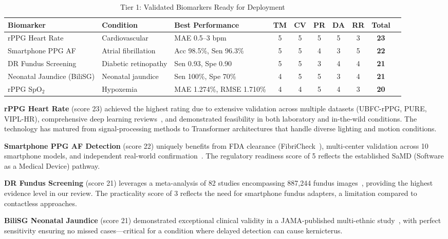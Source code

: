 \documentclass[conference]{IEEEtran}
\begin{document}
\begin{table}[t]
\caption{Tier 1: Validated Biomarkers Ready for Deployment}
\label{tab:tier1}
\centering
\small
\begin{tabular}{p{2.8cm}p{2.2cm}p{3.5cm}ccccccc}
\toprule
\textbf{Biomarker} & \textbf{Condition} & \textbf{Best Performance} & \textbf{TM} & \textbf{CV} & \textbf{PR} & \textbf{DA} & \textbf{RR} & \textbf{Total} \\
\midrule
rPPG Heart Rate & Cardiovascular & MAE 0.5--3 bpm & 5 & 5 & 5 & 5 & 3 & \textbf{23} \\
Smartphone PPG AF & Atrial fibrillation & Acc 98.5\%, Sen 96.3\% & 5 & 5 & 4 & 3 & 5 & \textbf{22} \\
DR Fundus Screening & Diabetic retinopathy & Sen 0.93, Spe 0.90 & 5 & 5 & 3 & 4 & 4 & \textbf{21} \\
Neonatal Jaundice (BiliSG) & Neonatal jaundice & Sen 100\%, Spe 70\% & 4 & 5 & 5 & 3 & 4 & \textbf{21} \\
rPPG SpO$_2$ & Hypoxemia & MAE 1.274\%, RMSE 1.710\% & 4 & 4 & 5 & 4 & 3 & \textbf{20} \\
\bottomrule
\end{tabular}
\end{table}

\textbf{rPPG Heart Rate} (score 23) achieved the highest rating due to extensive validation across multiple datasets (UBFC-rPPG, PURE, VIPL-HR), comprehensive deep learning reviews~\cite{debnath2025comprehensive}, and demonstrated feasibility in both laboratory and in-the-wild conditions. The technology has matured from signal-processing methods to Transformer architectures that handle diverse lighting and motion conditions.

\textbf{Smartphone PPG AF Detection} (score 22) uniquely benefits from FDA clearance (FibriCheck~\cite{fibricheck2025}), multi-center validation across 10 smartphone models, and independent real-world confirmation~\cite{gruwez2024realworld}. The regulatory readiness score of 5 reflects the established SaMD (Software as a Medical Device) pathway.

\textbf{DR Fundus Screening} (score 21) leverages a meta-analysis of 82 studies encompassing 887,244 fundus images~\cite{drreview2025}, providing the highest evidence level in our review. The practicality score of 3 reflects the need for smartphone fundus adapters, a limitation compared to contactless approaches.

\textbf{BiliSG Neonatal Jaundice} (score 21) demonstrated exceptional clinical validity in a JAMA-published multi-ethnic study~\cite{ngeow2024bilisg}, with perfect sensitivity ensuring no missed cases---critical for a condition where delayed detection can cause kernicterus.
\end{document}
